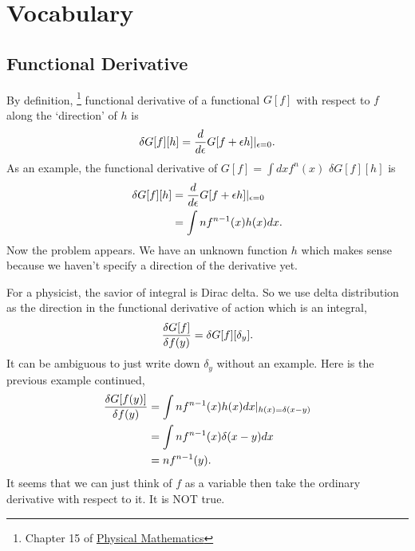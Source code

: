 \documentclass[letterpaper,10pt,english]{sphinxmanual}
\begin{document}
\section{Vocabulary}
\label{voc/vocabulary::doc}\label{voc/vocabulary:vocabulary}

\subsection{Functional Derivative}
\label{voc/vocabulary:functional-derivative}
By definition, \footnote{
Chapter 15 of \href{http://www.amazon.com/Physical-Mathematics-Kevin-Cahill/dp/1107005213}{Physical Mathematics}
} functional derivative of a functional \(G[f]\) with respect to \(f\) along the `direction' of \(h\) is
\begin{gather}
\begin{split}\delta G[f][h] = \frac{d}{d\epsilon} G[f+\epsilon h]\vert_{\epsilon=0}.\end{split}\notag
\end{gather}
As an example, the functional derivative of \(G[f]=\int dx f^n(x)\) \(\delta G[f][h]\) is
\begin{gather}
\begin{split}\delta G[f][h] &= \frac{d}{d\epsilon} G[f+\epsilon h] \vert_{\epsilon=0} \\
& = \int nf^{n-1}(x) h(x) dx.\end{split}\notag
\end{gather}
Now the problem appears. We have an unknown function \(h\) which makes sense because we haven't specify a direction of the derivative yet.

For a physicist, the savior of integral is Dirac delta. So we use delta distribution as the direction in the functional derivative of action which is an integral,
\begin{gather}
\begin{split}\frac{\delta G[f]}{\delta f(y)} = \delta G[f][\delta_y].\end{split}\notag
\end{gather}
It can be ambiguous to just write down \(\delta_y\) without an example. Here is the previous example continued,
\begin{gather}
\begin{split}\frac{\delta G[f(y)]}{\delta f(y)} &= \int nf^{n-1}(x) h(x) dx \vert_{h(x)= \delta(x-y)} \\
& = \int nf^{n-1}(x) \delta(x-y) dx \\
& = n f^{n-1}(y) .\end{split}\notag
\end{gather}
It seems that we can just think of \(f\) as a variable then take the ordinary derivative with respect to it. It is NOT true.
\end{document}
